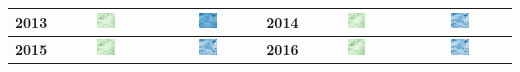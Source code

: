 \begin{longtable}{|c|c|c|c|c|c|}
    \textbf{2013} & \includegraphics[width=0.2\textwidth]{img_sat/NDVI_2013.png} & \includegraphics[width=0.2\textwidth]{img_sat/NSI_2013.png} &
    \textbf{2014} & \includegraphics[width=0.2\textwidth]{img_sat/NDVI_2014.png} & \includegraphics[width=0.2\textwidth]{img_sat/NSI_2014.png} \\
    \hline
    

    \textbf{2015} & \includegraphics[width=0.2\textwidth]{img_sat/NDVI_2015.png} & \includegraphics[width=0.2\textwidth]{img_sat/NSI_2015.png} &
    \textbf{2016} & \includegraphics[width=0.2\textwidth]{img_sat/NDVI_2016.png} & \includegraphics[width=0.2\textwidth]{img_sat/NSI_2016.png} \\
    \hline
    


\end{longtable}
